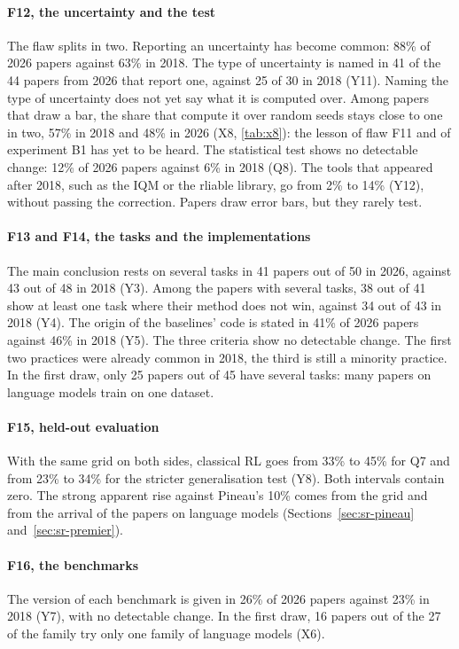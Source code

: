 \paragraph{F12, the uncertainty and the test}
The flaw splits in two. Reporting an uncertainty has become common: 88\% of 2026 papers against 63\% in
2018. The type of uncertainty is named in 41 of the 44 papers from 2026 that report one, against 25 of
30 in 2018 (Y11). Naming the type of uncertainty does not yet say what it is computed over. Among papers
that draw a bar, the share that compute it over random seeds stays close to one in two, 57\% in 2018 and
48\% in 2026 (X8, \cref{tab:x8}): the lesson of flaw F11 and of experiment B1 has yet to be heard. The
statistical test shows no detectable change: 12\% of 2026 papers against 6\% in
2018 (Q8). The tools that appeared after 2018, such as the IQM or the rliable library, go from 2\% to
14\% (Y12), without passing the correction. Papers draw error bars, but they rarely test.

\paragraph{F13 and F14, the tasks and the implementations}
The main conclusion rests on several tasks in 41 papers out of 50 in 2026, against 43 out of 48 in 2018
(Y3). Among the papers with several tasks, 38 out of 41 show at least one task where their method does
not win, against 34 out of 43 in 2018 (Y4). The origin of the baselines' code is stated in 41\% of 2026
papers against 46\% in 2018 (Y5). The three criteria show no detectable change. The first two
practices were already common in 2018, the third is still a minority practice. In the first draw, only
25 papers out of 45 have several tasks: many papers on language models train on one dataset.

\paragraph{F15, held-out evaluation}
With the same grid on both sides, classical RL goes from 33\% to 45\% for Q7 and from 23\% to 34\% for
the stricter generalisation test (Y8). Both intervals contain zero. The strong apparent rise against
Pineau's 10\% comes from the grid and from the arrival of the papers on language models (Sections~\ref{sec:sr-pineau}
and~\ref{sec:sr-premier}).

\paragraph{F16, the benchmarks}
The version of each benchmark is given in 26\% of 2026 papers against 23\% in 2018 (Y7), with no
detectable change. In the first draw, 16 papers out of the 27 of the  family try only one
family of language models (X6).

